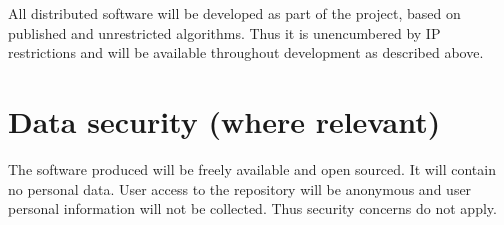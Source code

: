 \documentclass[a4paper,11pt]{article}
\begin{document}
All distributed software will be developed as part of the project, based on published and unrestricted algorithms.  Thus it is unencumbered by IP restrictions and will be available throughout development as described above.

\section{Data security (where relevant)}

The software produced will be freely available and open sourced.  It will contain no personal data.  User access to the repository will be anonymous and user personal information will not be collected.  Thus security concerns do not apply.
\end{document}
